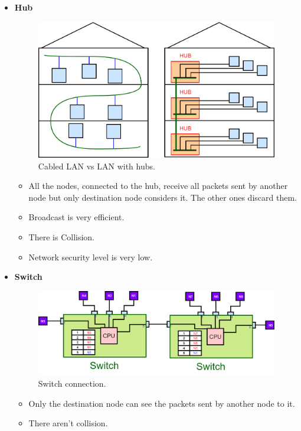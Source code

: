 \begin{itemize}
\item{\textbf{Hub}
\begin{figure}[H]
\centering
\includegraphics[scale=0.3]{Images/Layer2/cable_vs_hub}
\caption{\footnotesize{Cabled LAN vs LAN with hubs.}}\label{cable_vs_hub}
\end{figure}
\begin{itemize}
\item{All the nodes, connected to the hub, receive all packets sent by another node but only destination node considers it. The other ones discard them.}
\item{Broadcast is very efficient.}
\item{There is Collision.}
\item{Network security level is very low.}
\end{itemize}
}
\item{\textbf{Switch}
\begin{figure}[H]
\centering
\includegraphics[scale=0.5]{Images/Layer2/switch}
\caption{\footnotesize{Switch connection.}}\label{switch}
\end{figure}
\begin{itemize}
\item{Only the destination node can see the packets sent by another node to it.}
\item{There aren't collision.}

\end{itemize}}
\end{itemize}
